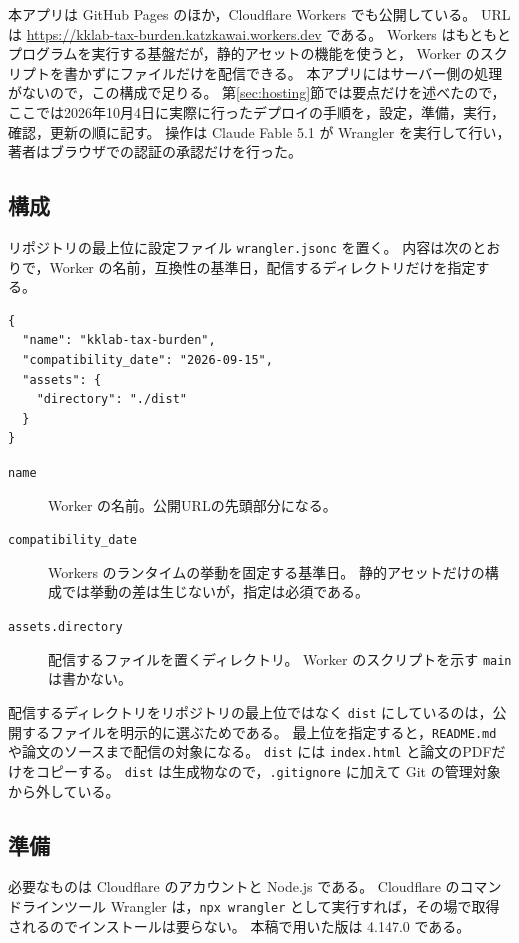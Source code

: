 \documentclass[paper=a4,fontsize=10pt]{jlreq}
\newcommand{\code}[1]{\texttt{#1}}
\begin{document}
本アプリは GitHub Pages のほか，Cloudflare Workers でも公開している。
URLは \url{https://kklab-tax-burden.katzkawai.workers.dev} である。
Workers はもともとプログラムを実行する基盤だが，静的アセットの機能\cite{cfassets}を使うと，
Worker のスクリプトを書かずにファイルだけを配信できる。
本アプリにはサーバー側の処理がないので，この構成で足りる。
第\ref{sec:hosting}節では要点だけを述べたので，
ここでは2026年10月4日に実際に行ったデプロイの手順を，設定，準備，実行，確認，更新の順に記す。
操作は Claude Fable 5.1 が Wrangler を実行して行い，著者はブラウザでの認証の承認だけを行った。

\subsection{構成}

リポジトリの最上位に設定ファイル \code{wrangler.jsonc} を置く。
内容は次のとおりで，Worker の名前，互換性の基準日，配信するディレクトリだけを指定する。
\begin{lstlisting}
{
  "name": "kklab-tax-burden",
  "compatibility_date": "2026-09-15",
  "assets": {
    "directory": "./dist"
  }
}
\end{lstlisting}
\begin{description}
  \item[\code{name}] Worker の名前。公開URLの先頭部分になる。
  \item[\code{compatibility\_date}] Workers のランタイムの挙動を固定する基準日。
    静的アセットだけの構成では挙動の差は生じないが，指定は必須である。
  \item[\code{assets.directory}] 配信するファイルを置くディレクトリ。
    Worker のスクリプトを示す \code{main} は書かない。
\end{description}

配信するディレクトリをリポジトリの最上位ではなく \code{dist} にしているのは，公開するファイルを明示的に選ぶためである。
最上位を指定すると，\code{README.md} や論文のソースまで配信の対象になる。
\code{dist} には \code{index.html} と論文のPDFだけをコピーする。
\code{dist} は生成物なので，\code{.gitignore} に加えて Git の管理対象から外している。

\subsection{準備}

必要なものは Cloudflare のアカウントと Node.js である。
Cloudflare のコマンドラインツール Wrangler は，\code{npx wrangler} として実行すれば，その場で取得されるのでインストールは要らない。
本稿で用いた版は 4.147.0 である。
\end{document}
